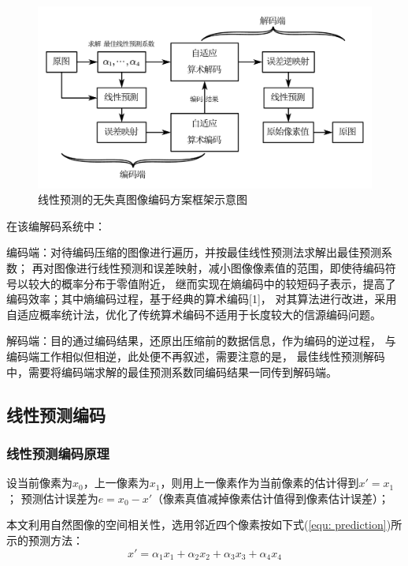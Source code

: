 \documentclass[12pt,a4paper]{article}%
\begin{document}
\begin{figure}[thb] \centering
    \includegraphics[scale=0.37,trim=0 20 0 20,clip]{imgs/LPC flow.pdf}
    \caption{线性预测的无失真图像编码方案框架示意图}
    \label{fig: system structure}
\end{figure}

在该编解码系统中：

编码端：对待编码压缩的图像进行遍历，并按最佳线性预测法求解出最佳预测系数；
再对图像进行线性预测和误差映射，减小图像像素值的范围，即使待编码符号以较大的概率分布于零值附近，
继而实现在熵编码中的较短码子表示，提高了编码效率；其中熵编码过程，基于经典的算术编码[1]，
对其算法进行改进，采用自适应概率统计法，优化了传统算术编码不适用于长度较大的信源编码问题。

解码端：目的通过编码结果，还原出压缩前的数据信息，作为编码的逆过程，
与编码端工作相似但相逆，此处便不再叙述，需要注意的是，
最佳线性预测解码中，需要将编码端求解的最佳预测系数同编码结果一同传到解码端。


\subsection{线性预测编码}
\subsubsection{线性预测编码原理}
设当前像素为$x_0$，上一像素为$x_1$，则用上一像素作为当前像素的估计得到$x'=x_1$；
预测估计误差为$e=x_0-x'$（像素真值减掉像素估计值得到像素估计误差）；

本文利用自然图像的空间相关性，选用邻近四个像素按如下式(\ref{equ: prediction})所示的预测方法：
\begin{equation}
    x'=\alpha_1x_1+\alpha_2x_2+\alpha_3x_3+\alpha_4x_4
    \label{equ: prediction}
\end{equation}
\end{document}
